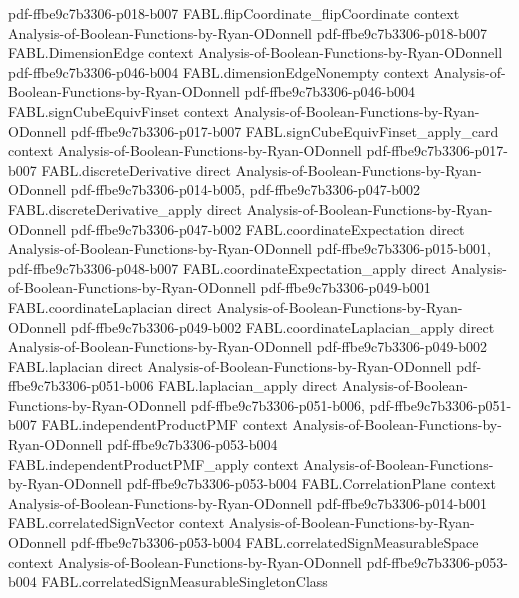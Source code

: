 \begin{theorem}
  {pdf-ffbe9c7b3306-p018-b007}
\proofstep
  {FABL.flipCoordinate_flipCoordinate}
  {context}
  {Analysis-of-Boolean-Functions-by-Ryan-ODonnell}
  {pdf-ffbe9c7b3306-p018-b007}
\proofstep
  {FABL.DimensionEdge}
  {context}
  {Analysis-of-Boolean-Functions-by-Ryan-ODonnell}
  {pdf-ffbe9c7b3306-p046-b004}
\proofstep
  {FABL.dimensionEdgeNonempty}
  {context}
  {Analysis-of-Boolean-Functions-by-Ryan-ODonnell}
  {pdf-ffbe9c7b3306-p046-b004}
\proofstep
  {FABL.signCubeEquivFinset}
  {context}
  {Analysis-of-Boolean-Functions-by-Ryan-ODonnell}
  {pdf-ffbe9c7b3306-p017-b007}
\proofstep
  {FABL.signCubeEquivFinset_apply_card}
  {context}
  {Analysis-of-Boolean-Functions-by-Ryan-ODonnell}
  {pdf-ffbe9c7b3306-p017-b007}
\proofstep
  {FABL.discreteDerivative}
  {direct}
  {Analysis-of-Boolean-Functions-by-Ryan-ODonnell}
  {pdf-ffbe9c7b3306-p014-b005,
    pdf-ffbe9c7b3306-p047-b002}
\proofstep
  {FABL.discreteDerivative_apply}
  {direct}
  {Analysis-of-Boolean-Functions-by-Ryan-ODonnell}
  {pdf-ffbe9c7b3306-p047-b002}
\proofstep
  {FABL.coordinateExpectation}
  {direct}
  {Analysis-of-Boolean-Functions-by-Ryan-ODonnell}
  {pdf-ffbe9c7b3306-p015-b001,
    pdf-ffbe9c7b3306-p048-b007}
\proofstep
  {FABL.coordinateExpectation_apply}
  {direct}
  {Analysis-of-Boolean-Functions-by-Ryan-ODonnell}
  {pdf-ffbe9c7b3306-p049-b001}
\proofstep
  {FABL.coordinateLaplacian}
  {direct}
  {Analysis-of-Boolean-Functions-by-Ryan-ODonnell}
  {pdf-ffbe9c7b3306-p049-b002}
\proofstep
  {FABL.coordinateLaplacian_apply}
  {direct}
  {Analysis-of-Boolean-Functions-by-Ryan-ODonnell}
  {pdf-ffbe9c7b3306-p049-b002}
\proofstep
  {FABL.laplacian}
  {direct}
  {Analysis-of-Boolean-Functions-by-Ryan-ODonnell}
  {pdf-ffbe9c7b3306-p051-b006}
\proofstep
  {FABL.laplacian_apply}
  {direct}
  {Analysis-of-Boolean-Functions-by-Ryan-ODonnell}
  {pdf-ffbe9c7b3306-p051-b006,
    pdf-ffbe9c7b3306-p051-b007}
\proofstep
  {FABL.independentProductPMF}
  {context}
  {Analysis-of-Boolean-Functions-by-Ryan-ODonnell}
  {pdf-ffbe9c7b3306-p053-b004}
\proofstep
  {FABL.independentProductPMF_apply}
  {context}
  {Analysis-of-Boolean-Functions-by-Ryan-ODonnell}
  {pdf-ffbe9c7b3306-p053-b004}
\proofstep
  {FABL.CorrelationPlane}
  {context}
  {Analysis-of-Boolean-Functions-by-Ryan-ODonnell}
  {pdf-ffbe9c7b3306-p014-b001}
\proofstep
  {FABL.correlatedSignVector}
  {context}
  {Analysis-of-Boolean-Functions-by-Ryan-ODonnell}
  {pdf-ffbe9c7b3306-p053-b004}
\proofstep
  {FABL.correlatedSignMeasurableSpace}
  {context}
  {Analysis-of-Boolean-Functions-by-Ryan-ODonnell}
  {pdf-ffbe9c7b3306-p053-b004}
\proofstep
  {FABL.correlatedSignMeasurableSingletonClass}

\end{theorem}
